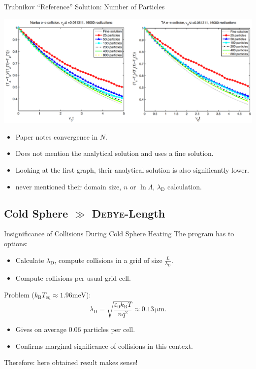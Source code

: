 \begin{frame}{Trubnikov ``Reference'' Solution: Number of Particles}
    \begin{minipage}{\textwidth}
        \centering
        \includegraphics[width=\textwidth]{ressources/test1/Wang_N.png}
    \end{minipage}
    \begin{itemize}
        \item Paper notes convergence in $N$.
        \item Does not mention the analytical solution and uses a fine solution.
        \item Looking at the first graph, their analytical solution is also significantly lower.
        \item \cite{Wang2008} never mentioned their domain size, $n$ or $\ln\Lambda$, $\lambda_\mathrm{D}$ calculation.
    \end{itemize}
\end{frame}


\subsection{Cold Sphere $\gg$ \textsc{Debye}-Length}

\begin{frame}{Insignificance of Collisions During Cold Sphere Heating}
    The program has to options:
    \begin{itemize}
        \item Calculate $\lambda_\mathrm{D}$, compute collisions in a grid of size $\frac{L}{\lambda_\mathrm{D}}$.
        \item Compute collisions per usual grid cell.
    \end{itemize}
    Problem ($k_\mathrm{B}T_\mathrm{eq} \approx 1.96\si{\milli\electronvolt}$):
    $$
    \lambda_\mathrm{D} = \sqrt{\frac{\varepsilon_0 k_\mathrm{B} T}{n q^2}} \approx 0.13\,\si{\micro\metre} .
    $$
    \begin{itemize}
        \item Gives on average $0.06$ particles per cell.
        \item Confirms marginal significance of collisions in this context.
    \end{itemize}
    Therefore: here obtained result makes sense!
\end{frame}


